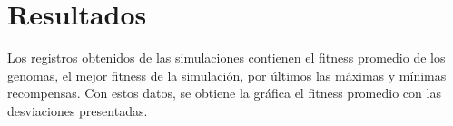 \documentclass[lettersize, journal]{IEEEtran}
\begin{document}
\section{Resultados}
Los registros obtenidos de las simulaciones contienen el fitness promedio de los genomas, el mejor fitness de la simulación, por últimos las máximas y mínimas recompensas. Con estos datos, se obtiene la gráfica el fitness promedio con las desviaciones presentadas.

\end{document}
